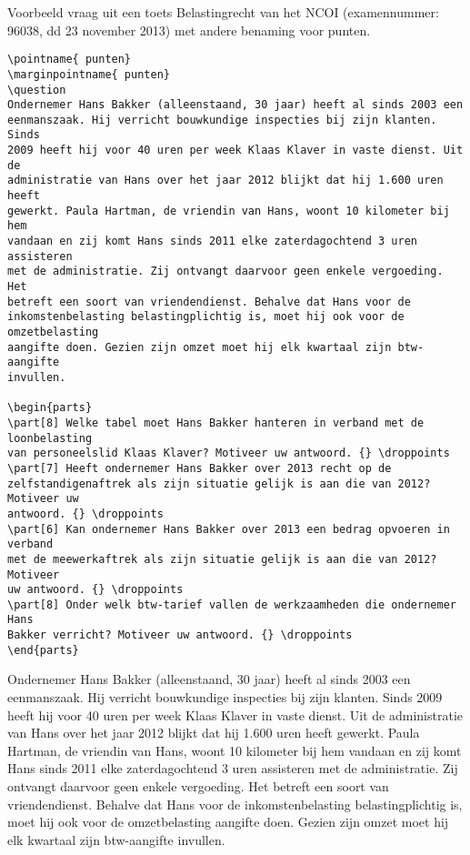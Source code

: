 \documentclass[12pt,dutch,addpoints,fleqn]{tisdexam}
\begin{document}
\begin{questions}
Voorbeeld vraag uit een toets Belastingrecht van het NCOI (examennummer:
96038, dd 23 november 2013) met andere benaming voor
punten.

\begin{lstlisting}
\pointname{ punten}
\marginpointname{ punten}
\question
Ondernemer Hans Bakker (alleenstaand, 30 jaar) heeft al sinds 2003 een
eenmanszaak. Hij verricht bouwkundige inspecties bij zijn klanten. Sinds
2009 heeft hij voor 40 uren per week Klaas Klaver in vaste dienst. Uit de
administratie van Hans over het jaar 2012 blijkt dat hij 1.600 uren heeft
gewerkt. Paula Hartman, de vriendin van Hans, woont 10 kilometer bij hem
vandaan en zij komt Hans sinds 2011 elke zaterdagochtend 3 uren assisteren
met de administratie. Zij ontvangt daarvoor geen enkele vergoeding. Het
betreft een soort van vriendendienst. Behalve dat Hans voor de
inkomstenbelasting belastingplichtig is, moet hij ook voor de omzetbelasting
aangifte doen. Gezien zijn omzet moet hij elk kwartaal zijn btw-aangifte
invullen.

\begin{parts}
\part[8] Welke tabel moet Hans Bakker hanteren in verband met de loonbelasting
van personeelslid Klaas Klaver? Motiveer uw antwoord. {} \droppoints
\part[7] Heeft ondernemer Hans Bakker over 2013 recht op de
zelfstandigenaftrek als zijn situatie gelijk is aan die van 2012? Motiveer uw
antwoord. {} \droppoints
\part[6] Kan ondernemer Hans Bakker over 2013 een bedrag opvoeren in verband
met de meewerkaftrek als zijn situatie gelijk is aan die van 2012? Motiveer
uw antwoord. {} \droppoints
\part[8] Onder welk btw-tarief vallen de werkzaamheden die ondernemer Hans
Bakker verricht? Motiveer uw antwoord. {} \droppoints
\end{parts}
\end{lstlisting}

\question
Ondernemer Hans Bakker (alleenstaand, 30 jaar) heeft al sinds 2003 een
eenmanszaak. Hij verricht bouwkundige inspecties bij zijn klanten. Sinds
2009 heeft hij voor 40 uren per week Klaas Klaver in vaste dienst. Uit de
administratie van Hans over het jaar 2012 blijkt dat hij 1.600 uren heeft
gewerkt. Paula Hartman, de vriendin van Hans, woont 10 kilometer bij hem
vandaan en zij komt Hans sinds 2011 elke zaterdagochtend 3 uren assisteren
met de administratie. Zij ontvangt daarvoor geen enkele vergoeding. Het
betreft een soort van vriendendienst. Behalve dat Hans voor de
inkomstenbelasting belastingplichtig is, moet hij ook voor de omzetbelasting
aangifte doen. Gezien zijn omzet moet hij elk kwartaal zijn btw-aangifte
invullen.


\end{questions}
\end{document}
